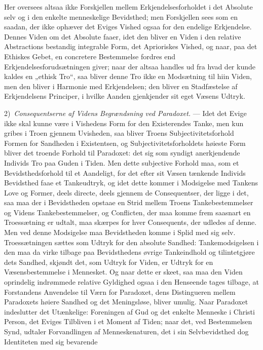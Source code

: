 \documentclass[12pt,a4paper]{book}
\newcommand{\opage}[1]{\marginnote{\footnotesize\textit{[#1]}}}
\begin{document}
Her oversees altsaa ikke Forskjellen mellem Erkjendelsesforholdet i det Absolute selv og i den
enkelte menneskelige Bevidsthed; men Forskjellen sees som en saadan, der ikke ophæver det Eviges
Vished ogsaa for den endelige Erkjendelse. Dennes Viden om det Absolute faaer, idet den bliver en
Viden i den relative Abstractions bestandig integrable \opage{219}Form, det Aprioriskes Vished, og naar, paa
det Ethiskes Gebet, en concretere Bestemmelse fordres end Erkjendelsesforudsætningen giver; naar
der altsaa handles ud fra hvad der kunde kaldes en „ethisk Tro“, saa bliver denne Tro ikke en
Modsætning til hiin Viden, men den bliver i Harmonie med Erkjendelsen; den bliver en Stadfæstelse
af Erkjendelsens Principer, i hvilke Aanden gjenkjender sit eget Væsens Udtryk.

2)~\emph{Consequentserne af Videns Begrændsning ved Paradoxet.} --- Idet det Evige ikke skal
kunne være i Vishedens Form for den Existerendes Tanke, men kun gribes i Troen gjennem Uvisheden,
saa bliver Troens Subjectivitetsforhold Formen for Sandheden i Existentsen, og
Subjectivitetsforholdets høieste Form bliver det troende Forhold til Paradoxet: det sig som
syndigt anerkjendende Individs Tro paa Guden i Tiden. Men dette subjective Forhold maa, som et
Bevidsthedsforhold til et Aandeligt, for det efter sit Væsen tænkende Individs Bevidsthed faae et
Tankeudtryk, og idet dette kommer i Modsigelse med Tankens Love og Former, deels directe, deels
gjennem de Consequentser, der ligge i det, saa maa der i Bevidstheden opstaae en Strid mellem
Troens Tankebestemmelser og Videns Tankebestemmelser, og Conflicten, der maa komme frem saasnart
en Troessætning er udtalt, maa skærpes for hver Consequents, der udledes af denne. Men ved denne
Modsigelse maa Bevidstheden komme i Splid med sig selv. Troessætningen sættes som Udtryk for den
absolute Sandhed: Tankemodsigelsen i den maa da virke tilbage paa Bevidsthedens øvrige
Tankeindhold og tilintetgjøre dets Sandhed, skjøndt det, som Udtryk for Viden, er Udtryk for en
Væsensbestemmelse i Mennesket. Og naar dette er skeet, saa maa den Viden oprindelig indrømmede
relative Gyldighed ogsaa i den Henseende tages tilbage, at Forstandens Anvendelse til Værn for
Paradoxet, dens Distingueren mellem Paradoxets høiere Sandhed og det Meningsløse, bliver umulig.
Naar Paradoxet indeslutter det Utænkelige: Foreningen af Gud og det enkelte Menneske i Christi
Person, det Eviges Tilbliven i et Moment af Tiden; naar det, ved \opage{220}Bestemmelsen Synd, udtaler
Forvandlingen af Menneskenaturen, det i sin Selvbevidsthed dog Identiteten med sig bevarende
\end{document}
